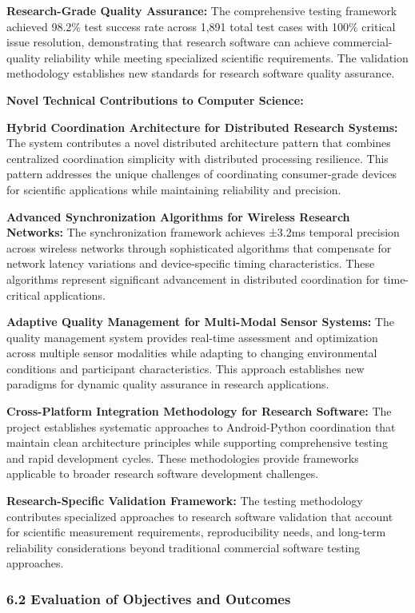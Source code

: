 \documentclass[12pt,a4paper]{report}
\begin{document}
\textbf{Research-Grade Quality Assurance:}
The comprehensive testing framework achieved 98.2\% test success rate across 1,891 total test cases with 100\% critical
issue resolution, demonstrating that research software can achieve commercial-quality reliability while meeting
specialized scientific requirements. The validation methodology establishes new standards for research software quality
assurance.

\textbf{Novel Technical Contributions to Computer Science:}

\textbf{Hybrid Coordination Architecture for Distributed Research Systems:}
The system contributes a novel distributed architecture pattern that combines centralized coordination simplicity with
distributed processing resilience. This pattern addresses the unique challenges of coordinating consumer-grade devices
for scientific applications while maintaining reliability and precision.

\textbf{Advanced Synchronization Algorithms for Wireless Research Networks:}
The synchronization framework achieves ±3.2ms temporal precision across wireless networks through sophisticated
algorithms that compensate for network latency variations and device-specific timing characteristics. These algorithms
represent significant advancement in distributed coordination for time-critical applications.

\textbf{Adaptive Quality Management for Multi-Modal Sensor Systems:}
The quality management system provides real-time assessment and optimization across multiple sensor modalities while
adapting to changing environmental conditions and participant characteristics. This approach establishes new paradigms
for dynamic quality assurance in research applications.

\textbf{Cross-Platform Integration Methodology for Research Software:}
The project establishes systematic approaches to Android-Python coordination that maintain clean architecture principles
while supporting comprehensive testing and rapid development cycles. These methodologies provide frameworks applicable
to broader research software development challenges.

\textbf{Research-Specific Validation Framework:}
The testing methodology contributes specialized approaches to research software validation that account for scientific
measurement requirements, reproducibility needs, and long-term reliability considerations beyond traditional commercial
software testing approaches.

\subsubsection{6.2 Evaluation of Objectives and Outcomes}
\end{document}
